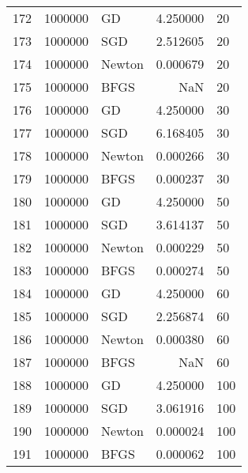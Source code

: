 \begin{tabular}{lllrl}
172 &  1000000 &      GD &    4.250000 &     20 \\
173 &  1000000 &     SGD &    2.512605 &     20 \\
174 &  1000000 &  Newton &    0.000679 &     20 \\
175 &  1000000 &    BFGS &         NaN &     20 \\
176 &  1000000 &      GD &    4.250000 &     30 \\
177 &  1000000 &     SGD &    6.168405 &     30 \\
178 &  1000000 &  Newton &    0.000266 &     30 \\
179 &  1000000 &    BFGS &    0.000237 &     30 \\
180 &  1000000 &      GD &    4.250000 &     50 \\
181 &  1000000 &     SGD &    3.614137 &     50 \\
182 &  1000000 &  Newton &    0.000229 &     50 \\
183 &  1000000 &    BFGS &    0.000274 &     50 \\
184 &  1000000 &      GD &    4.250000 &     60 \\
185 &  1000000 &     SGD &    2.256874 &     60 \\
186 &  1000000 &  Newton &    0.000380 &     60 \\
187 &  1000000 &    BFGS &         NaN &     60 \\
188 &  1000000 &      GD &    4.250000 &    100 \\
189 &  1000000 &     SGD &    3.061916 &    100 \\
190 &  1000000 &  Newton &    0.000024 &    100 \\
191 &  1000000 &    BFGS &    0.000062 &    100 \\
\bottomrule
\end{tabular}
